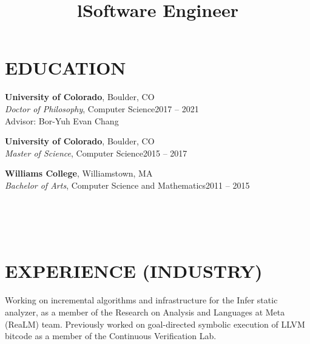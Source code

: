 \documentclass[margin,10pt]{res}
\begin{document}
\begin{resume}

\section{EDUCATION}
\textbf{University of Colorado}, Boulder, CO\\
{\sl Doctor of Philosophy}, Computer Science\hfill 2017 -- 2021\\
Advisor: Bor-Yuh Evan Chang

\textbf{University of Colorado}, Boulder, CO\\
{\sl Master of Science}, Computer Science\hfill 2015 -- 2017

\textbf{Williams College}, Williamstown, MA\\
{\sl Bachelor of Arts}, Computer Science and Mathematics\hfill 2011 -- 2015


\begin{format}
\title{l}\\
\\
\body\\
\end{format}

\section{EXPERIENCE (INDUSTRY)}
\title{\textbf{Software Engineer}}
\begin{position}
  Working on incremental algorithms and infrastructure for the Infer static analyzer, as a member of the Research on Analysis and Languages at Meta (ReaLM) team.
  Previously worked on goal-directed symbolic execution of LLVM bitcode as a member of the Continuous Verification Lab.
\end{position}


\end{resume}
\end{document}
